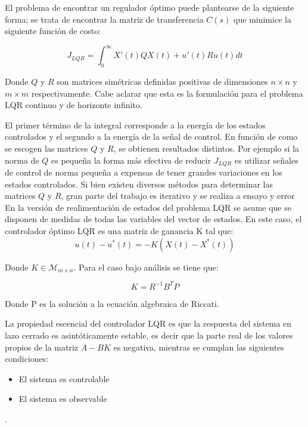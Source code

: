 \documentclass[main]{subfiles}
\begin{document}
El problema de encontrar un regulador \'optimo puede plantearse de la siguiente forma; se trata de encontrar la matriz de transferencia $C(s)$ que minimice la siguiente funci\'on de costo:

\begin{equation}
\label{eq:lqr}
J_{LQR} = \int_{0}^{\infty}  X'(t)Q X(t)+u'(t)Ru(t)dt
\end{equation}

Donde $Q$ y $R$ son matrices sim\'etricas definidas positivas de dimensiones $n\times n$ y $m\times m$ respectivamente. Cabe aclarar que esta es la formulaci\'on para el problema LQR continuo y de horizonte infinito. 


El primer t\'ermino de la integral corresponde a la energ\'ia de los estados controlados y el segundo a la energ\'ia de la señal de control. En funci\'on de como se escogen las matrices $Q$ y $R$, se obtienen resultados distintos. Por ejemplo si la norma de $Q$ es pequeña la forma m\'as efectiva de reducir $J_{LQR}$ es utilizar señales de control de norma pequeña a expensas de tener grandes variaciones en los estados controlados. Si bien existen diversos m\'etodos para determinar las matrices $Q$ y $R$, gran parte del trabajo es iterativo y se realiza a ensayo y error\\  

En la versi\'on de realimentaci\'on de estados del problema LQR se asume que se disponen de medidas de todas las variables del vector de estados. En este caso, el controlador \'optimo LQR es una matriz de ganancia K tal que:
\begin{equation}
u(t)-u^*(t) = -K(X(t)-X^*(t))
\end{equation}

Donde $K\in\mathcal{M}_{m\times n}$. Para el caso bajo an\'alisis se tiene que: 

\begin{equation}
K = R^{-1}B^TP
\end{equation}

Donde P es la soluci\'on a la ecuaci\'on algebraica de Riccati.

La propiedad escencial del controlador LQR es que la respuesta del sistema en lazo cerrado es asint\'oticamente estable, es decir que la parte real de los valores propios de la matriz $A-BK$ es negativa, mientras se cumplan las siguientes condiciones:

\begin{itemize}
\item El sistema es controlable
\item El sistema es observable
\end{itemize}.
\end{document}
